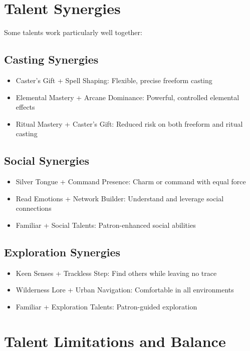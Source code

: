 \documentclass[11pt,twoside,openany]{book}
\begin{document}
\section*{Talent Synergies} 

Some talents work particularly well together:

\subsection*{Casting Synergies}

\begin{itemize}
\item Caster's Gift + Spell Shaping: Flexible, precise freeform casting
\item Elemental Mastery + Arcane Dominance: Powerful, controlled elemental effects
\item Ritual Mastery + Caster's Gift: Reduced risk on both freeform and ritual casting
\end{itemize}

\subsection*{Social Synergies}

\begin{itemize}
\item Silver Tongue + Command Presence: Charm or command with equal force
\item Read Emotions + Network Builder: Understand and leverage social connections
\item Familiar + Social Talents: Patron-enhanced social abilities
\end{itemize}

\subsection*{Exploration Synergies}

\begin{itemize}
\item Keen Senses + Trackless Step: Find others while leaving no trace
\item Wilderness Lore + Urban Navigation: Comfortable in all environments
\item Familiar + Exploration Talents: Patron-guided exploration
\end{itemize}

\section*{Talent Limitations and Balance} 
\end{document}
